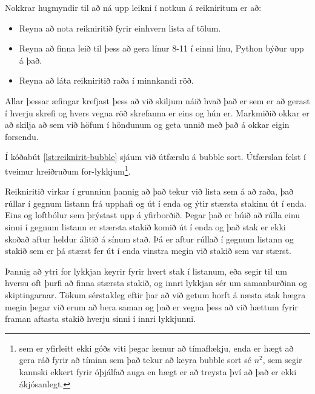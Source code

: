 \vspace{1cm}

Nokkrar hugmyndir til að ná upp leikni í notkun á reikniritum er að:
\begin{itemize}
	\item Reyna að nota reikniritið fyrir einhvern lista af tölum.
	\item Reyna að finna leið til þess að gera línur 8-11 í einni línu, Python býður upp á það.
	\item Reyna að láta reikniritið raða í minnkandi röð.
\end{itemize}

Allar þessar æfingar krefjast þess að við skiljum náið hvað það er sem er að gerast í hverju skrefi og hvers vegna röð skrefanna er eins og hún er.
Markmiðið okkar er að skilja að sem við höfum í höndunum og geta unnið með það á okkar eigin forsendu.

\vspace{1cm}

Í kóðabút \ref{lst:reiknirit-bubble} sjáum við útfærslu á bubble sort.
Útfærslan felst í tveimur hreiðruðum for-lykkjum\footnote{sem er yfirleitt ekki góðs viti þegar kemur að tímaflækju, enda er hægt að gera ráð fyrir að tíminn sem það tekur að keyra bubble sort sé $n^2$, sem segir kannski ekkert fyrir óþjálfað auga en hægt er að treysta því að það er ekki ákjósanlegt.}.

Reikniritið virkar í grunninn þannig að það tekur við lista sem á að raða, það rúllar í gegnum listann frá upphafi og út í enda og ýtir stærsta stakinu út í enda.
Eins og loftbólur sem þrýstast upp á yfirborðið.
Þegar það er búið að rúlla einu sinni í gegnum listann er stærsta stakið komið út í enda og það stak er ekki skoðað aftur heldur álitið á sínum stað.
Þá er aftur rúllað í gegnum listann og stakið sem er þá stærst fer út í enda vinstra megin við stakið sem var stærst.

Þannig að ytri for lykkjan keyrir fyrir hvert stak í listanum, eða segir til um hversu oft þurfi að finna stærsta stakið, og innri lykkjan sér um samanburðinn og skiptingarnar.
Tökum sérstakleg eftir þar að við getum horft á næsta stak hægra megin þegar við erum að bera saman og það er vegna þess að við hættum fyrir framan aftasta stakið hverju sinni í innri lykkjunni.

